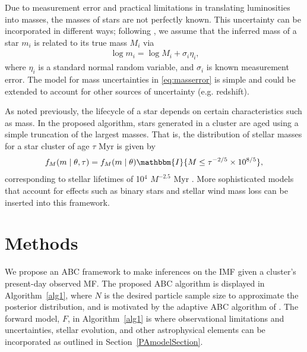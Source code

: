 \documentclass[12pt]{article}
\newcommand{\indic}{\mathbbm{I}}
\begin{document}
Due to measurement error and practical limitations in translating luminosities into masses, the masses of stars are not perfectly known. 
This uncertainty can be incorporated in different ways; following \cite{weisz13}, we assume that the inferred mass of a star $m_i$ is related to its true mass $M_i$ via 
\begin{align}
	\log m_i = \log M_i + \sigma_i \eta_i \text{,}
	\label{eq:masserror}
\end{align}
where $\eta_i$ is a standard normal random variable, and $\sigma_i$ is known measurement error.   %
The model for mass uncertainties in \eqref{eq:masserror} is simple and could be extended to account for other sources of uncertainty (e.g. redshift).

As noted previously, the lifecycle of a star depends on certain characteristics such as mass.  In the proposed algorithm, stars generated in a cluster are aged using a simple truncation of the largest masses.  
That is, the distribution of stellar masses for a star cluster of age $\tau$ Myr is given by
	\begin{align}
	f_M(m \mid \theta, \tau) = f_M(m \mid \theta) \indic \{M \leq \tau^{-2/5} \times 10^{8/5}\} \text{,}
	\label{eq:age}
	\end{align}
corresponding to stellar lifetimes of 10$^4$ $M^{-2.5}$ Myr \citep{hansen2004}. 
More sophisticated models that account for effects such as binary stars and stellar wind mass loss can be inserted into this framework.  



\section{Methods}
\label{methodSec}

We propose an ABC framework to make inferences on the IMF given a cluster's present-day observed MF.  The proposed ABC algorithm is displayed in Algorithm~\eqref{alg1}, where $N$ is the desired particle sample size to approximate the posterior distribution, and is motivated by the adaptive ABC algorithm of \cite{beaumont2009}.  The forward model, $F$, in Algorithm~\eqref{alg1} is where observational limitations and uncertainties, stellar evolution, and other astrophysical elements can be incorporated as outlined in Section~\ref{PAmodelSection}.
\end{document}
